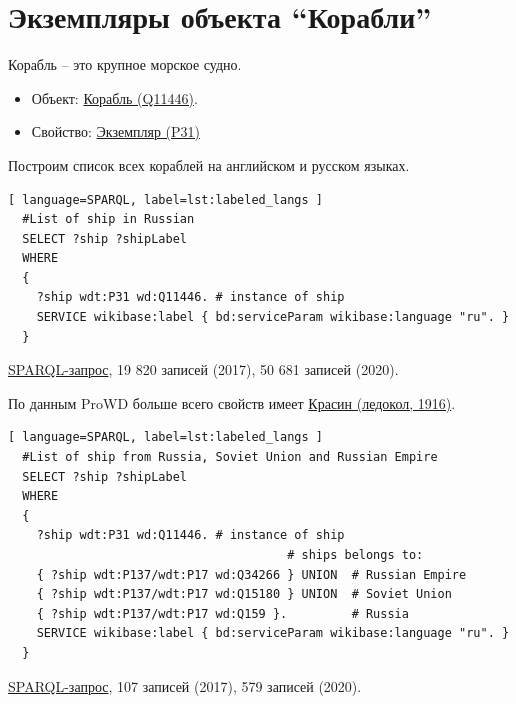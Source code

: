 \section{Экземпляры объекта ``Корабли''}

Корабль -- это крупное морское судно.

\begin{itemize}
  \item Объект: \href{https://www.wikidata.org/wiki/Q11446}{Корабль (Q11446)}.
  \item Свойство: \href{https://www.wikidata.org/wiki/Property:P31}{Экземпляр (P31)}
\end{itemize}

Построим список всех кораблей на английском и русском языках.

\begin{lstlisting}[ language=SPARQL, label=lst:labeled_langs ]
  #List of ship in Russian
  SELECT ?ship ?shipLabel
  WHERE
  {
    ?ship wdt:P31 wd:Q11446. # instance of ship
    SERVICE wikibase:label { bd:serviceParam wikibase:language "ru". }
  }
\end{lstlisting}

\href{https://query.wikidata.org/#%23List%20of%20ship%20in%20English%20and%20Russian%0ASELECT%20%3Fship%20%3FshipLabel%0AWHERE%0A%7B%0A%20%20%3Fship%20wdt%3AP31%20wd%3AQ11446.%0A%20%20SERVICE%20wikibase%3Alabel%20%7B%20bd%3AserviceParam%20wikibase%3Alanguage%20"ru".%20%7D%0A%7D}{SPARQL-запрос}, 19 820 записей (2017), 50 681 записей (2020).

По данным ProWD больше всего свойств имеет \href{https://www.wikidata.org/wiki/Q281147}{Красин (ледокол, 1916)}.

\begin{lstlisting}[ language=SPARQL, label=lst:labeled_langs ]
  #List of ship from Russia, Soviet Union and Russian Empire
  SELECT ?ship ?shipLabel
  WHERE
  {
    ?ship wdt:P31 wd:Q11446. # instance of ship
                                       # ships belongs to:
    { ?ship wdt:P137/wdt:P17 wd:Q34266 } UNION  # Russian Empire
    { ?ship wdt:P137/wdt:P17 wd:Q15180 } UNION  # Soviet Union
    { ?ship wdt:P137/wdt:P17 wd:Q159 }.         # Russia
    SERVICE wikibase:label { bd:serviceParam wikibase:language "ru". }
  }
\end{lstlisting}

\href{https://query.wikidata.org/#%23List%20of%20ship%20from%20Russia%2C%20Soviet%20Union%20and%20Russian%20Empire%0ASELECT%20%3Fship%20%3FshipLabel%0AWHERE%0A%7B%0A%20%20%3Fship%20wdt%3AP31%20wd%3AQ11446.%20%23%20instance%20of%20ship%0A%20%20%20%20%20%20%20%20%20%20%20%20%20%20%20%20%20%20%20%20%20%20%20%20%20%20%20%20%20%20%20%20%20%20%20%20%20%23%20ships%20belongs%20to%3A%0A%20%20%7B%20%3Fship%20wdt%3AP137%2Fwdt%3AP17%20wd%3AQ34266%20%7D%20UNION%20%20%23%20Russian%20Empire%0A%20%20%7B%20%3Fship%20wdt%3AP137%2Fwdt%3AP17%20wd%3AQ15180%20%7D%20UNION%20%20%23%20Soviet%20Union%0A%20%20%7B%20%3Fship%20wdt%3AP137%2Fwdt%3AP17%20wd%3AQ159%20%7D.%20%20%20%20%20%20%20%20%20%23%20Russia%0A%20%20SERVICE%20wikibase%3Alabel%20%7B%20bd%3AserviceParam%20wikibase%3Alanguage%20"ru".%20%7D%0A%7D}{SPARQL-запрос}, 107 записей (2017), 579 записей (2020).

